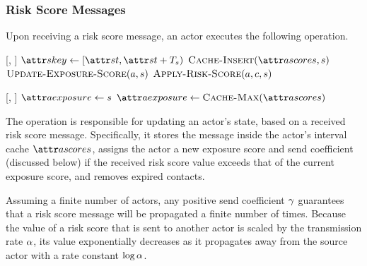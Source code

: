 \subsubsection{Risk Score Messages}

Upon receiving a risk score message, an actor executes the following operation.
%
\begin{function}{\nHandleRiskScore}[\vActor, \vScore]
    \State $\aScoreKey \assign [\aScoreTime, \aScoreTime + \pScoreExpiry)$
    \State $\cCacheInsert[\aActorScores, \vScore]$
    \State $\cUpdateExposureScore[\vActor, \vScore]$
    \ForEach{$\vContact \in \aActorContacts$}
      \State $\cApplyRiskScore[\vActor, \vContact, \vScore]$
    \EndFor
  \EndIf
\end{function}
%
\begin{function}{\nUpdateExposureScore}[\vActor, \vScore]
  \If{$\aActorExposureValue < \aScoreValue$}
    \State $\aActorExposure \assign \vScore$
    \State $\aActorExposure \assign \cCacheMax[\aActorScores]$
  \EndIf
\end{function}
%
The  operation is responsible for updating an actor's state, based on a received risk score message. Specifically, it stores the message inside the actor's interval cache $\aActorScores$, assigns the actor a new exposure score and send coefficient (discussed below) if the received risk score value exceeds that of the current exposure score, and removes expired contacts.


Assuming a finite number of actors, any positive send coefficient $\gamma$ guarantees that a risk score message will be propagated a finite number of times. Because the value of a risk score that is sent to another actor is scaled by the transmission rate $\alpha$, its value exponentially decreases as it propagates away from the source actor with a rate constant $\log \alpha$.

